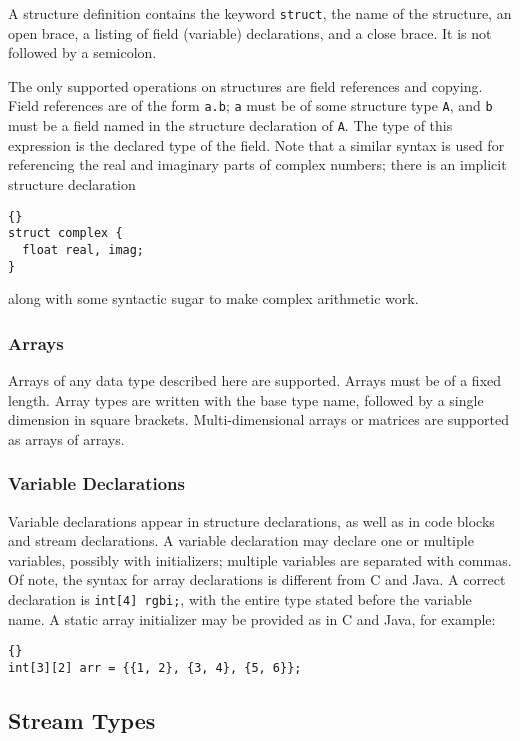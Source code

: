 \documentclass[11pt]{article}
\begin{document}
A structure definition contains the keyword \lstinline|struct|, the name
of the structure, an open brace, a listing of field (variable)
declarations, and a close brace.  It is not followed by a semicolon.

The only supported operations on structures are field references and
copying.  Field references are of the form \lstinline|a.b|; \lstinline|a| must
be of some structure type \lstinline|A|, and \lstinline|b| must be a field named
in the structure declaration of \lstinline|A|.  The type of this expression
is the declared type of the field.  Note that a similar syntax is used
for referencing the real and imaginary parts of complex numbers; there
is an implicit structure declaration

\begin{lstlisting}{}
struct complex {
  float real, imag;
}
\end{lstlisting}{}

\noindent
along with some syntactic sugar to make complex arithmetic work.

\subsubsection{Arrays}

Arrays of any data type described here are supported.  Arrays must be
of a fixed length.  Array types are written with the base type name,
followed by a single dimension in square brackets.  Multi-dimensional
arrays or matrices are supported as arrays of arrays.

\subsubsection{Variable Declarations}

Variable declarations appear in structure declarations, as well as in
code blocks and stream declarations.  A variable declaration may
declare one or multiple variables, possibly with initializers;
multiple variables are separated with commas.  Of note, the syntax for
array declarations is different from C and Java.  A correct
declaration is \lstinline|int[4] rgbi;|, with the entire type stated
before the variable name.  A static array initializer may be provided
as in C and Java, for example:

\begin{lstlisting}{}
int[3][2] arr = {{1, 2}, {3, 4}, {5, 6}};
\end{lstlisting}{}

\subsection{Stream Types}
\end{document}
